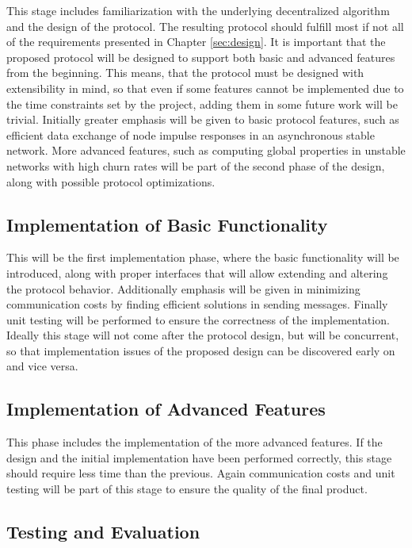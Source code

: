 \documentclass[MSc]{icldt}
\begin{document}
This stage includes familiarization with the underlying decentralized algorithm and the design of the protocol. The resulting protocol should fulfill most if not all of the requirements presented in Chapter \ref{sec:design}. It is important that the proposed protocol will be designed to support both basic and advanced features from the beginning. This means, that the protocol must be designed with extensibility in mind, so that even if some features cannot be implemented due to the time constraints set by the project, adding them in some future work will be trivial. Initially greater emphasis will be given to basic protocol features, such as efficient data exchange of node impulse responses in an asynchronous stable network. More advanced features, such as computing global properties in unstable networks with high churn rates will be part of the second phase of the design, along with possible protocol optimizations. 

\subsection*{Implementation of Basic Functionality}

This will be the first implementation phase, where the basic functionality will be introduced, along with proper interfaces that will allow extending and altering the protocol behavior. Additionally emphasis will be given in minimizing communication costs by finding efficient solutions in sending messages. Finally unit testing will be performed to ensure the correctness of the implementation. Ideally this stage will not come after the protocol design, but will be concurrent, so that implementation issues of the proposed design can be discovered early on and vice versa.

\subsection*{Implementation of Advanced Features}

This phase includes the implementation of the more advanced features. If the design and the initial implementation have been performed correctly, this stage should require less time than the previous. Again communication costs and unit testing will be part of this stage to ensure the quality of the final product.

\subsection*{Testing and Evaluation}
\end{document}
